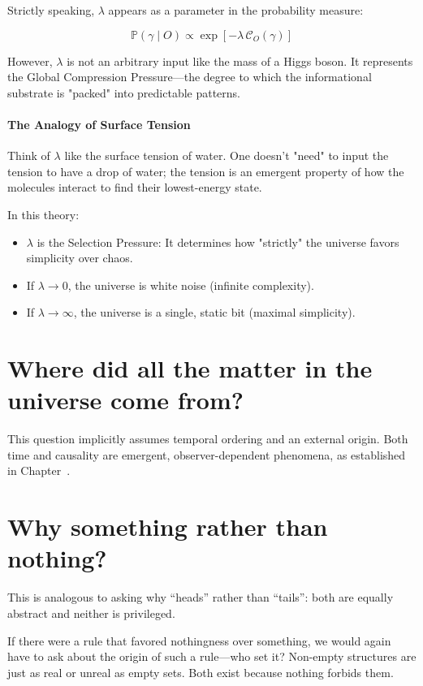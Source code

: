 Strictly speaking, \(\lambda\) appears as a parameter in the probability measure: 

\[
\mathbb{P}(\gamma \mid O) \propto \exp[-\lambda\, \mathcal{C}_O(\gamma)]
\]

However, \(\lambda\) is not an arbitrary input like the mass of a Higgs boson.
It represents the Global Compression Pressure—the degree to which the informational substrate is "packed" into predictable patterns.

\paragraph{The Analogy of Surface Tension}
Think of \(\lambda\) like the surface tension of water.
One doesn't "need" to input the tension to have a drop of water; the tension is an emergent property of how the molecules interact to find their lowest-energy state. 

In this theory:
\begin{itemize}
    \item \(\lambda\) is the Selection Pressure: It determines how "strictly" the universe favors simplicity over chaos.
    \item If \(\lambda \to 0\), the universe is white noise (infinite complexity).
    \item If \(\lambda \to \infty\), the universe is a single, static bit (maximal simplicity).
\end{itemize}


\section*{Where did all the matter in the universe come from?}

This question implicitly assumes temporal ordering and an external origin.
Both time and causality are emergent, observer-dependent phenomena, as established in Chapter~.


\section*{Why something rather than nothing?}

This is analogous to asking why ``heads'' rather than ``tails'': both are equally abstract and neither is privileged.

If there were a rule that favored nothingness over something, we would again have to ask about the origin of such a rule—who set it?
Non-empty structures are just as real or unreal as empty sets. Both exist because nothing forbids them.


